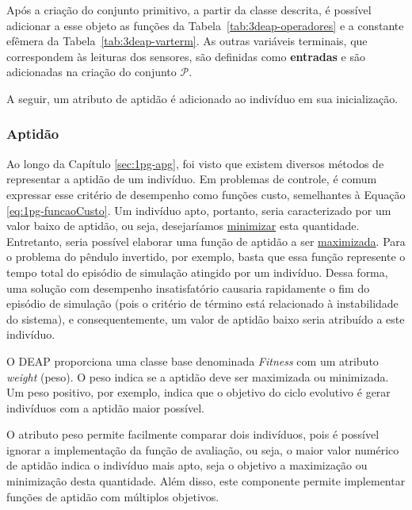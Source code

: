 Após a criação do conjunto primitivo, a partir da classe descrita, é
possível adicionar a esse objeto as funções da Tabela~\ref{tab:3deap-operadores} e a constante efêmera da Tabela~\ref{tab:3deap-varterm}. As outras variáveis terminais, que correspondem às leituras dos sensores, são definidas como \textbf{entradas} e são adicionadas na
criação do conjunto $\mathcal{P}$.



A seguir, um atributo de aptidão é adicionado ao indivíduo em sua inicialização.

\subsubsection{Aptidão}\label{sssec:3deap-aptidao}

Ao longo da Capítulo \ref{sec:1pg-apg}, foi visto que existem diversos métodos de representar a aptidão de um indivíduo. Em problemas de controle, é comum expressar esse critério de desempenho como funções custo, semelhantes à Equação \ref{eq:1pg-funcaoCusto}. Um indivíduo apto, portanto, seria caracterizado por um valor baixo de aptidão, ou seja, desejaríamos \underline{minimizar} esta quantidade. Entretanto, seria possível elaborar uma função de aptidão a ser \underline{maximizada}. Para o problema do pêndulo invertido, por exemplo, basta que essa função represente o tempo total do episódio de simulação atingido por um indivíduo. Dessa forma, uma solução com desempenho insatisfatório causaria rapidamente o fim do episódio de simulação (pois o critério de término está relacionado à instabilidade do sistema), e consequentemente, um valor de aptidão baixo seria atribuído a este indivíduo.

O DEAP proporciona uma classe base denominada \textit{Fitness} com um atributo \textit{weight} (peso). O peso indica se a aptidão deve ser maximizada ou minimizada. Um peso positivo, por exemplo, indica que o objetivo do ciclo evolutivo é gerar indivíduos com a aptidão maior possível.

O atributo peso permite facilmente comparar dois indivíduos, pois é possível ignorar a implementação da função de avaliação, ou seja, o maior valor numérico de aptidão indica o indivíduo mais apto, seja o objetivo a maximização ou minimização desta quantidade. Além disso, este componente permite implementar funções de aptidão com múltiplos objetivos.

